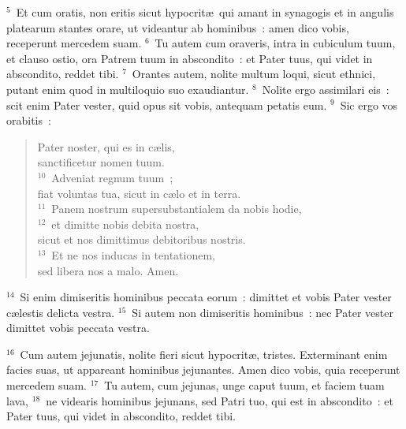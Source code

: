 ${}^{5}$~Et cum oratis, non eritis sicut hypocrit\ae\ qui amant in synagogis et in angulis platearum stantes orare, ut videantur ab hominibus~: amen dico vobis, receperunt mercedem suam.
${}^{6}$~Tu autem cum oraveris, intra in cubiculum tuum, et clauso ostio, ora Patrem tuum in abscondito~: et Pater tuus, qui videt in abscondito, reddet tibi.
${}^{7}$~Orantes autem, nolite multum loqui, sicut ethnici, putant enim quod in multiloquio suo exaudiantur.
${}^{8}$~Nolite ergo assimilari eis~: scit enim Pater vester, quid opus sit vobis, antequam petatis eum.
${}^{9}$~Sic ergo vos orabitis~: \begin{flushleft}\begin{verse}Pater noster, qui es in c\ae lis,\\ sanctificetur nomen tuum.\\
${}^{10}$~Adveniat regnum tuum~;\\ fiat voluntas tua, sicut in c\ae lo et in terra.\\
${}^{11}$~Panem nostrum supersubstantialem da nobis hodie,\\
${}^{12}$~et dimitte nobis debita nostra,\\ sicut et nos dimittimus debitoribus nostris.\\
${}^{13}$~Et ne nos inducas in tentationem,\\ sed libera nos a malo. Amen.\end{verse}\end{flushleft}


${}^{14}$~Si enim dimiseritis hominibus peccata eorum~: dimittet et vobis Pater vester c\ae lestis delicta vestra.
${}^{15}$~Si autem non dimiseritis hominibus~: nec Pater vester dimittet vobis peccata vestra.


${}^{16}$~Cum autem jejunatis, nolite fieri sicut hypocrit\ae , tristes. Exterminant enim facies suas, ut appareant hominibus jejunantes. Amen dico vobis, quia receperunt mercedem suam.
${}^{17}$~Tu autem, cum jejunas, unge caput tuum, et faciem tuam lava,
${}^{18}$~ne videaris hominibus jejunans, sed Patri tuo, qui est in abscondito~: et Pater tuus, qui videt in abscondito, reddet tibi.


